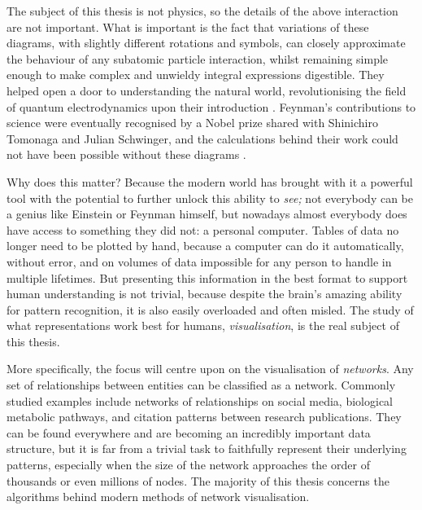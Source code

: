 The subject of this thesis is not physics, so the details of the above interaction are not important. What is important is the fact that variations of these diagrams, with slightly different rotations and symbols, can closely approximate the behaviour of any subatomic particle interaction, whilst remaining simple enough to make complex and unwieldy integral expressions digestible. They helped open a door to understanding the natural world, revolutionising the field of quantum electrodynamics upon their introduction \citep{Kaiser2005}.
Feynman's contributions to science were eventually recognised by a Nobel prize shared with Shinichiro Tomonaga and Julian Schwinger, and the calculations behind their work could not have been possible without these diagrams \citep{Kaiser2009}.

Why does this matter? Because the modern world has brought with it a powerful tool with the potential to further unlock this ability to \emph{see;}
not everybody can be a genius like Einstein or Feynman himself, but nowadays almost everybody does have access to something they did not: a personal computer.
Tables of data no longer need to be plotted by hand, because a computer can do it automatically, without error, and on volumes of data impossible for any person to handle in multiple lifetimes.
But presenting this information in the best format to support human understanding is not trivial, because despite the brain's amazing ability for pattern recognition, it is also easily overloaded and often misled.
The study of what representations work best for humans, \emph{visualisation}, is the real subject of this thesis.

More specifically, the focus will centre upon on the visualisation of \emph{networks}. 
Any set of relationships between entities can be classified as a network. Commonly studied examples include networks of relationships on social media, biological metabolic pathways, and citation patterns between research publications. They can be found everywhere and are becoming an incredibly important data structure, but it is far from a trivial task to faithfully represent their underlying patterns, especially when the size of the network approaches the order of thousands or even millions of nodes. The majority of this thesis concerns the algorithms behind modern methods of network visualisation.


